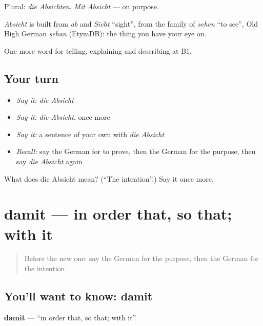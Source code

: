 Plural: \emph{die Absichten}. \emph{Mit Absicht} — on purpose.

\begin{cousinweb}
\emph{Absicht} is built from \emph{ab} and \emph{Sicht} \textquotedblleft{}sight\textquotedblright{}, from the family of \emph{sehen} \textquotedblleft{}to see\textquotedblright{}, Old High German \emph{sehan} (EtymDB): the thing you have your eye on.
\end{cousinweb}

\begin{grammarlens}[title={What you've built}]
One more word for telling, explaining and describing at B1.
\end{grammarlens}

\subsection*{Your turn}
\begin{itemize}
\raggedright
  \item \emph{Say it:} \emph{die Absicht}
  \item \emph{Say it:} \emph{die Absicht}, once more
  \item \emph{Say it:} a sentence of your own with \emph{die Absicht}
  \item \emph{Recall:} say the German for to prove, then the German for the purpose, then say \emph{die Absicht} again
\end{itemize}

\begin{tcolorbox}[breakable,colback=teal!4,colframe=teal!35!black,title={Before you move on}]
What does die Absicht mean? (\textquotedblleft{}The intention\textquotedblright{}.) Say it once more.
\end{tcolorbox}
\section[damit]{damit — in order that, so that; with it}

\label{lesson:GE-C346-damit}



\begin{quote}
Before the new one: say the German for the purpose, then the German for the intention.
\end{quote}

\subsection*{You'll want to know: damit}
\textbf{damit} — \textquotedblleft{}in order that, so that; with it\textquotedblright{}.

